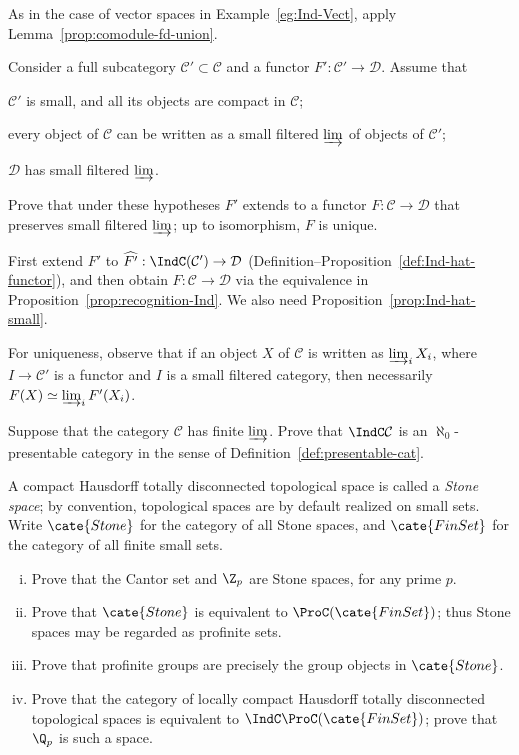 \begin{Exercises}
	\begin{hint}
		As in the case of vector spaces in Example~\ref{eg:Ind-Vect}, apply Lemma~\ref{prop:comodule-fd-union}.
	\end{hint}

	\item Consider a full subcategory $\mathcal{C}'\subset\mathcal{C}$ and a functor $F':\mathcal{C}'\to\mathcal{D}$. Assume that
	\begin{compactitem}
		\item $\mathcal{C}'$ is small, and all its objects are compact in $\mathcal{C}$;
		\item every object of $\mathcal{C}$ can be written as a small filtered $\varinjlim$ of objects of $\mathcal{C}'$;
		\item $\mathcal{D}$ has small filtered $\varinjlim$.
	\end{compactitem}
	Prove that under these hypotheses $F'$ extends to a functor $F:\mathcal{C}\to\mathcal{D}$ that preserves small filtered $\varinjlim$; up to isomorphism, $F$ is unique.

	\begin{hint}
		First extend $F'$ to $\widehat{F'}:\IndC(\mathcal{C}')\to\mathcal{D}$ (Definition--Proposition~\ref{def:Ind-hat-functor}), and then obtain $F:\mathcal{C}\to\mathcal{D}$ via the equivalence in Proposition~\ref{prop:recognition-Ind}. We also need Proposition~\ref{prop:Ind-hat-small}.

		For uniqueness, observe that if an object $X$ of $\mathcal{C}$ is written as $\varinjlim_iX_i$, where $I\to\mathcal{C}'$ is a functor and $I$ is a small filtered category, then necessarily $F(X)\simeq\varinjlim_iF'(X_i)$.
	\end{hint}

	\item Suppose that the category $\mathcal{C}$ has finite $\varinjlim$. Prove that $\IndC\mathcal{C}$ is an $\aleph_0$-presentable category in the sense of Definition~\ref{def:presentable-cat}.

	\item A compact Hausdorff totally disconnected topological space is called a \emph{Stone space}; by convention, topological spaces are by default realized on small sets. Write $\cate{Stone}$ for the category of all Stone spaces, and $\cate{FinSet}$ for the category of all finite small sets.
	\begin{enumerate}[(i)]
		\item Prove that the Cantor set and $\Z_p$ are Stone spaces, for any prime $p$.
		\item Prove that $\cate{Stone}$ is equivalent to $\ProC(\cate{FinSet})$; thus Stone spaces may be regarded as profinite sets.
		\item Prove that profinite groups are precisely the group objects in $\cate{Stone}$.
		\item Prove that the category of locally compact Hausdorff totally disconnected topological spaces is equivalent to $\IndC\ProC(\cate{FinSet})$; prove that $\Q_p$ is such a space.
	\end{enumerate}


\end{Exercises}

